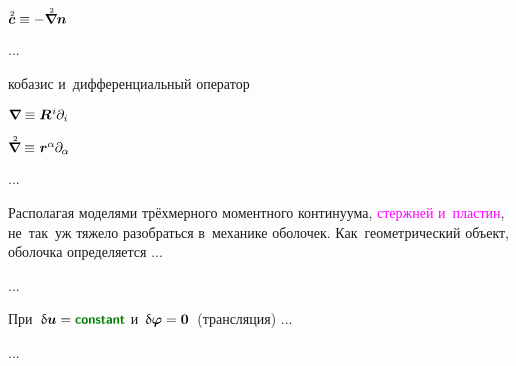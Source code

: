 \begin{otherlanguage}{russian}
${\mathtwoabove{\bm{c}} \equiv - \boldnablaflat \bm{n}}$

...

\noindent кобазис и~дифференциальный оператор 

${\bm{\nabla}\hspace{-0.2ex} \equiv \bm{R}^{\hspace{.1ex}i} \hspace{-0.1ex} \partial_i}$

${\boldnablaflat \equiv \hspace{.1ex} \bm{r}^\alpha \hspace{-0.1ex} \partial_{\hspace{-0.1ex}\alpha}}$

...




\end{otherlanguage}



\begin{otherlanguage}{russian}

Располагая моделями трёхмерного моментного континуума, \textcolor{magenta}{стержней и~пластин}, не~так~уж тяжело разобраться в~механике оболочек. Как~геометрический объект, оболочка определяется ...

...







\end{otherlanguage}



\begin{otherlanguage}{russian}

При~${\variation{\fieldofdisplacements} = \boldconstant}$ и~${\updelta\hspace{-0.1ex}\bm{\varphi} = \bm{0}}$~(трансляция) ...

...



\end{otherlanguage}

